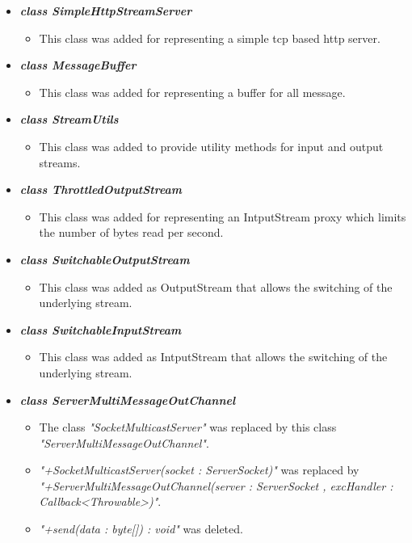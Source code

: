 \documentclass[a4paper,10pt]{scrartcl}
\begin{document}
\begin{itemize}
   
	\item \textbf{\textit{class SimpleHttpStreamServer}}
	\begin{itemize}
	 \item This class was added for representing a simple tcp based http server.
	\end{itemize}
	
   \item \textbf{\textit{class MessageBuffer}}
	\begin{itemize}
	 \item This class was added for representing a buffer for all message.
	\end{itemize}
	
	 \item \textbf{\textit{class StreamUtils}}
	\begin{itemize}
	 \item This class was added to provide utility methods for input and output streams.
	\end{itemize}
	
	 \item \textbf{\textit{class ThrottledOutputStream}}
	\begin{itemize}
	 \item This class was added for representing an IntputStream proxy which limits the number of bytes read per second.
	\end{itemize}
	
	\item \textbf{\textit{class SwitchableOutputStream}}
	\begin{itemize}
	 \item This class was added as OutputStream that allows the switching of the underlying stream.
	\end{itemize}
	
	\item \textbf{\textit{class SwitchableInputStream}}
	\begin{itemize}
	 \item This class was added as IntputStream that allows the switching of the underlying stream.
	\end{itemize}
	
	\item \textit{\textbf{class ServerMultiMessageOutChannel}}
	\begin{itemize}
	 \item The class \textit{"SocketMulticastServer"} was replaced by this class \textit{"ServerMultiMessageOutChannel"}.
	 \item \textit{"+SocketMulticastServer(socket : ServerSocket)"} was replaced by 
	 \textit{"+ServerMultiMessageOutChannel(server : ServerSocket , excHandler : Callback<Throwable>)"}.
	 \item \textit{"+send(data : byte[]) : void"} was deleted.
	\end{itemize}
	

\end{itemize}
\end{document}
